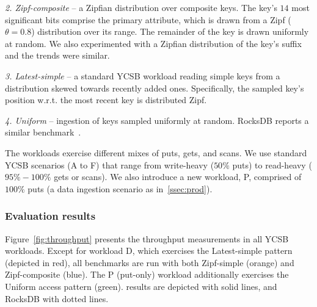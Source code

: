 \emph{2. Zipf-composite} -- a Zipfian distribution over composite keys.
The key's $14$ most significant bits comprise the primary attribute, which  
is drawn from a Zipf ($\theta=0.8$) distribution over its range. The remainder of the key is drawn uniformly at random.
We also experimented with a Zipfian distribution of the key's suffix and 
the trends were similar. %

\emph{3. Latest-simple} -- a standard YCSB workload reading simple keys from a distribution skewed towards recently added ones. 
Specifically, the sampled key's position w.r.t. the most recent key is distributed Zipf. 

\emph{4. Uniform} -- ingestion of keys sampled uniformly at random. RocksDB
reports a similar benchmark~\cite{rocksdb-benchmarks}. %

The workloads exercise different mixes of puts, gets, and scans. We use standard YCSB scenarios 
(A to F) that range from write-heavy ($50\%$ puts) to read-heavy ($95\%-100\%$ gets or scans). 
We also introduce a new workload, P, comprised of $100\%$ puts (a data ingestion scenario
as in~\cref{ssec:prod}).


\subsubsection{Evaluation results}
Figure~\ref{fig:throughput} presents the throughput measurements in all YCSB workloads. 
Except for workload D, which exercises the Latest-simple pattern
(depicted in red), all benchmarks are run with both  Zipf-simple (orange) 
and Zipf-composite (blue). The P (put-only) workload 
additionally exercises the Uniform access pattern (green). \sys\/ results are depicted with solid
lines, and RocksDB with dotted lines. 

